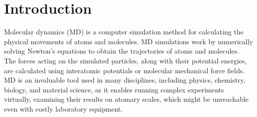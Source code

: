 \chapter*{Introduction}

Molecular dynamics (MD) is a computer simulation method for calculating the
physical movements of atoms and molecules. MD simulations work by numerically
solving Newton's equations to obtain the trajectories of atoms and molecules.
The forces acting on the simulated particles, along with their potential
energies, are calculated using interatomic potentials or molecular mechanical
force fields. MD is an invaluable tool used in many disciplines, including
physics, chemistry, biology, and material science, as it enables running
complex experiments virtually, examining their results on atomary scales,
which might be unreachable even with costly laboratory equipment.
